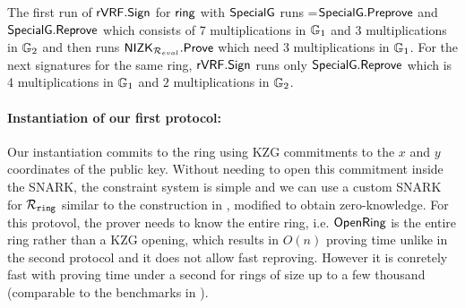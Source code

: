 The first run of ${\mathsf{rVRF}}.{\mathsf{Sign}}$ for $\mathsf{ring}$ with $ {\mathsf{SpecialG}} $ runs =${\mathsf{SpecialG}}.{\mathsf{Preprove}}$ and $ {\mathsf{SpecialG}}.{\mathsf{Reprove}}$ which consists of  7 multiplications in $\mathbb{G}_1 $ and $3$ multiplications in $\mathbb{G}_2$ and then runs ${\mathsf{NIZK}}_{\mathcal{R}_{eval}}.{\mathsf{Prove}}$ which need  3 multiplications in $ \mathbb{G}_1 $.
For the next signatures for the same ring,  ${\mathsf{rVRF}}.{\mathsf{Sign}}$  runs only  ${\mathsf{SpecialG}}.{\mathsf{Reprove}}$ which is 4 multiplications in $\mathbb{G}_1 $ and $2$ multiplications in $\mathbb{G}_2$.



\paragraph{Instantiation of our first protocol:}  Our instantiation commits to the ring using KZG commitments to the $ x $ and $ y $ coordinates of the public key. Without needing to open this commitment inside the SNARK, the constraint system is simple and we can use a custom SNARK for $\mathcal{R}_{\mathtt{ring}}$ similar to the construction in \cite{accountable}, modified to obtain zero-knowledge.  For this protovol, the prover needs to know the entire ring, i.e. ${\mathsf{OpenRing}}$ is the entire ring rather than a KZG opening, which results in $O(n)$ proving time unlike in the second protocol and it does not allow fast reproving. However it is conretely fast with proving time under a second for rings of size up to a few thousand (comparable to the benchmarks in \cite{accountable}).  
